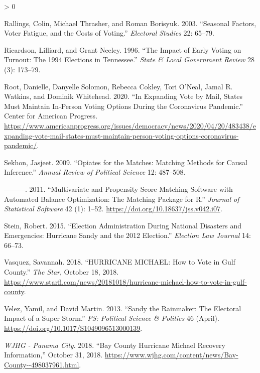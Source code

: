 \documentclass[
  12pt,
]{article}
\newlength{\cslhangindent}
\newenvironment{CSLReferences}[2] %
 {%
  \setlength{\parindent}{0pt}
  \ifodd #1 \everypar{\setlength{\hangindent}{\cslhangindent}}\ignorespaces\fi
  \ifnum #2 > 0
  \setlength{\parskip}{#2\baselineskip}
  \fi
 }%
 {}
\begin{document}
\begin{CSLReferences}{1}{0}
\leavevmode\hypertarget{ref-Rallings2003}{}%
Rallings, Colin, Michael Thrasher, and Roman Borisyuk. 2003. {``Seasonal {Factors}, Voter Fatigue, and the Costs of Voting.''} \emph{Electoral Studies} 22: 65--79.

\leavevmode\hypertarget{ref-Ricardson1996}{}%
Ricardson, Lilliard, and Grant Neeley. 1996. {``The {Impact} of {Early Voting} on {Turnout}: {The} 1994 {Elections} in {Tennessee}.''} \emph{State \& Local Government Review} 28 (3): 173--79.

\leavevmode\hypertarget{ref-Root2020}{}%
Root, Danielle, Danyelle Solomon, Rebecca Cokley, Tori O'Neal, Jamal R. Watkins, and Dominik Whitehead. 2020. {``In {Expanding Vote} by {Mail}, {States Must Maintain In-Person Voting Options During} the {Coronavirus Pandemic}.''} {Center for American Progress}. \url{https://www.americanprogress.org/issues/democracy/news/2020/04/20/483438/expanding-vote-mail-states-must-maintain-person-voting-options-coronavirus-pandemic/}.

\leavevmode\hypertarget{ref-Sekhon2009}{}%
Sekhon, Jasjeet. 2009. {``Opiates for the {Matches}: {Matching Methods} for {Causal Inference}.''} \emph{Annual Review of Political Science} 12: 487--508.

\leavevmode\hypertarget{ref-Sekhon2011}{}%
---------. 2011. {``Multivariate and {Propensity Score Matching Software} with {Automated Balance Optimization}: {The Matching} Package for {R}.''} \emph{Journal of Statistical Software} 42 (1): 1--52. \url{https://doi.org/10.18637/jss.v042.i07}.

\leavevmode\hypertarget{ref-Stein2015}{}%
Stein, Robert. 2015. {``Election {Administration During National Disasters} and {Emergencies}: {Hurricane Sandy} and the 2012 {Election}.''} \emph{Election Law Journal} 14: 66--73.

\leavevmode\hypertarget{ref-Vasquez2018}{}%
Vasquez, Savannah. 2018. {``{HURRICANE MICHAEL}: {How} to Vote in {Gulf County}.''} \emph{The Star}, October 18, 2018. \url{https://www.starfl.com/news/20181018/hurricane-michael-how-to-vote-in-gulf-county}.

\leavevmode\hypertarget{ref-Velez2013}{}%
Velez, Yamil, and David Martin. 2013. {``Sandy the {Rainmaker}: {The Electoral Impact} of a {Super Storm}.''} \emph{PS: Political Science \& Politics} 46 (April). \url{https://doi.org/10.1017/S1049096513000139}.

\leavevmode\hypertarget{ref-WJHG2018}{}%
\emph{WJHG - Panama City}. 2018. {``Bay {County Hurricane Michael Recovery Information},''} October 31, 2018. \url{https://www.wjhg.com/content/news/Bay-County--498037961.html}.

\end{CSLReferences}
\end{document}
